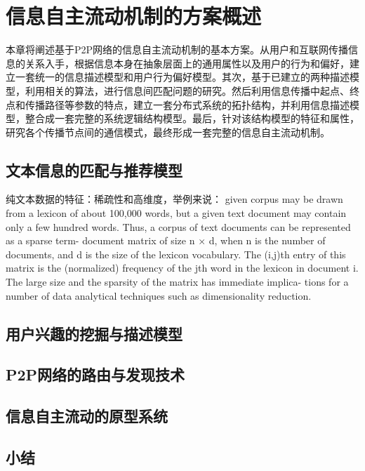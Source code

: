 \section{信息自主流动机制的方案概述}
本章将阐述基于P2P网络的信息自主流动机制的基本方案。从用户和互联网传播信息的关系入手，根据信息本身在抽象层面上的通用属性以及用户的行为和偏好，建立一套统一的信息描述模型和用户行为偏好模型。其次，基于已建立的两种描述模型，利用相关的算法，进行信息间匹配问题的研究。然后利用信息传播中起点、终点和传播路径等参数的特点，建立一套分布式系统的拓扑结构，并利用信息描述模型，整合成一套完整的系统逻辑结构模型。最后，针对该结构模型的特征和属性，研究各个传播节点间的通信模式，最终形成一套完整的信息自主流动机制。

\subsection{文本信息的匹配与推荐模型}
纯文本数据的特征：稀疏性和高维度，举例来说： given corpus may be drawn from a lexicon of about 100,000 words, but a given text document may contain only a few hundred words. Thus, a corpus of text documents can be represented as a sparse term- document matrix of size n × d, when n is the number of documents, and d is the size of the lexicon vocabulary. The (i,j)th entry of this matrix is the (normalized) frequency of the jth word in the lexicon in document i. The large size and the sparsity of the matrix has immediate implica- tions for a number of data analytical techniques such as dimensionality reduction.

\subsection{用户兴趣的挖掘与描述模型}

\subsection{P2P网络的路由与发现技术}

\subsection{信息自主流动的原型系统}

\subsection{小结}
